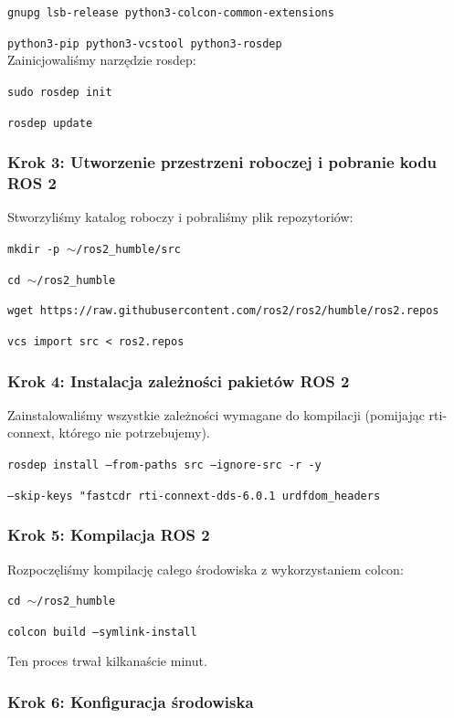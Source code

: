 \documentclass[12pt]{article}
\begin{document}
\texttt{gnupg lsb-release python3-colcon-common-extensions}


\texttt{python3-pip python3-vcstool python3-rosdep}
\\

Zainicjowaliśmy narzędzie rosdep:

\texttt{sudo rosdep init}


\texttt{rosdep update}


\subsubsection{Krok 3: Utworzenie przestrzeni roboczej i pobranie kodu ROS 2}

Stworzyliśmy katalog roboczy i pobraliśmy plik repozytoriów:


\texttt{mkdir -p $\sim$/ros2\_humble/src}

\texttt{cd $\sim$/ros2\_humble}

\texttt{wget https://raw.githubusercontent.com/ros2/ros2/humble/ros2.repos}

\texttt{vcs import src < ros2.repos}

\subsubsection{Krok 4: Instalacja zależności pakietów ROS 2}

Zainstalowaliśmy wszystkie zależności wymagane do kompilacji (pomijając rti-connext, którego nie potrzebujemy).


\texttt{rosdep install --from-paths src --ignore-src -r -y}

\texttt{--skip-keys "fastcdr rti-connext-dds-6.0.1 urdfdom\_headers}


\subsubsection{Krok 5: Kompilacja ROS 2}

Rozpoczęliśmy kompilację całego środowiska z wykorzystaniem colcon:

\texttt{cd $\sim$/ros2\_humble}

\texttt{colcon build --symlink-install}

Ten proces trwał kilkanaście minut.


\subsubsection{Krok 6: Konfiguracja środowiska}
\end{document}
